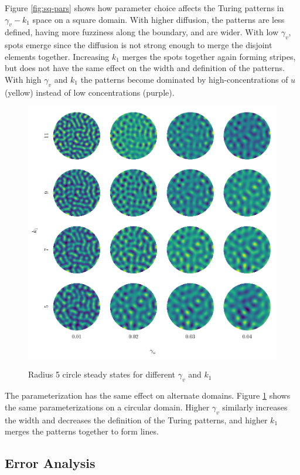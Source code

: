 Figure \ref{fig:sq-pars} shows how parameter choice affects the Turing patterns in $\gamma_v - k_1$ space on a square domain. With higher diffusion, the patterns are less defined, having more fuzziness along the boundary, and are wider. With low $\gamma_v$, spots emerge since the diffusion is not strong enough to merge the disjoint elements together. Increasing $k_1$ merges the spots together again forming stripes, but does not have the same effect on the width and definition of the patterns. With high $\gamma_v$ and $k_1$ the patterns become dominated by high-concentrations of $u$ (yellow) instead of low concentrations (purple).

\begin{figure}[t!]
    \centering
    \caption{Radius 5 circle steady states for different $\gamma_v$ and $k_1$}
    \includegraphics{figures/circle_params.pdf}
    \label{fig:cir-pars}
\end{figure}

The parameterization has the same effect on alternate domains. Figure \ref{fig:cir-pars} shows the same parameterizations on a circular domain. Higher $\gamma_v$ similarly increases the width and decreases the definition of the Turing patterns, and higher $k_1$ merges the patterns together to form lines.


\subsection{Error Analysis} \label{subsec:err}

